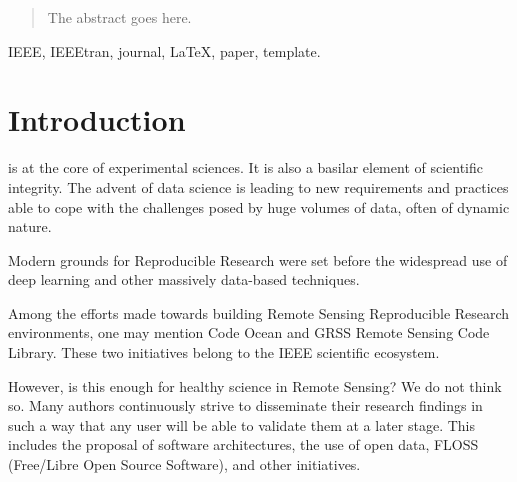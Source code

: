 \documentclass[journal]{IEEEtran}
\begin{document}
	\maketitle
	
	\begin{abstract}
		The abstract goes here.
	\end{abstract}
	
	\begin{IEEEkeywords}
		IEEE, IEEEtran, journal, \LaTeX, paper, template.
	\end{IEEEkeywords}
	
	
	
	
	
	
	\IEEEpeerreviewmaketitle
	
	
	
	\section{Introduction}
	
	 is at the core of experimental sciences. 
	It is also a basilar element of scientific integrity. 
	The advent of data science is leading to new requirements and practices able to cope with the challenges posed by huge volumes of data, often of dynamic nature. 
	
	Modern grounds for Reproducible Research were set before the widespread use of deep learning and other massively data-based techniques. 
	
	Among the efforts made towards building Remote Sensing Reproducible Research environments, one may mention Code Ocean and GRSS Remote Sensing Code Library. 
	These two initiatives belong to the IEEE scientific ecosystem. 
	
	However, is this enough for healthy science in Remote Sensing? 
	We do not think so. 
	Many authors continuously strive to disseminate their research findings in such a way that any user will be able to validate them at a later stage. 
	This includes the proposal of software architectures, the use of open data, FLOSS (Free/Libre Open Source Software), and other initiatives.
		
\end{document}
